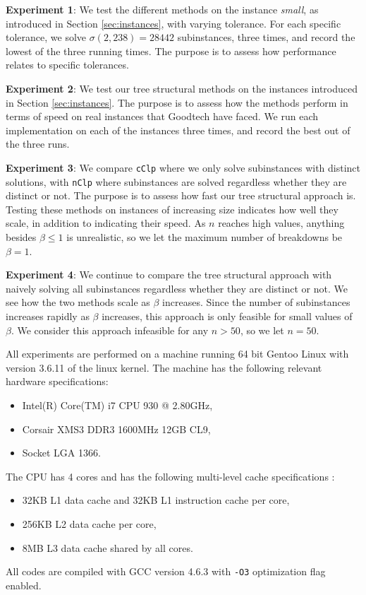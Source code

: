 \textbf{Experiment 1}:
We test the different
methods on the instance \textit{small}, as introduced in Section
\ref{sec:instances}, with varying tolerance.
For each specific tolerance, we solve $\sigma(2, 238) = 28442$ subinstances, three times,
and record the lowest of the three running times.
The purpose is to assess how performance relates to specific tolerances.

\textbf{Experiment 2}:
We test our tree structural methods on the instances introduced in Section
\ref{sec:instances}.
The purpose is to assess how the methods perform in terms of speed
on real instances that Goodtech have faced.
We run each implementation on each of the instances three times, and record
the best out of the three runs.

\textbf{Experiment 3}:
We compare \texttt{cClp} where we only solve subinstances with distinct
solutions, with \texttt{nClp} where subinstances are solved regardless
whether they are distinct or not.
The purpose is to assess how fast our tree structural approach is.
Testing these methods on instances of increasing size indicates how well
they scale, in addition to indicating their speed. 
As $n$ reaches high values, anything besides $\beta \leq 1$ is unrealistic,
so we let the maximum number of breakdowns be $\beta = 1$.

\textbf{Experiment 4}:
We continue to compare the tree structural approach with naively solving all
subinstances regardless whether they are distinct or not. We
see how the two methods scale as $\beta$ increases. Since the number
of subinstances increases rapidly as $\beta$ increases, this approach is only
feasible for small values of $\beta$. We consider this approach infeasible for
any $n > 50$, so we let $n = 50$.

All experiments are performed on a machine running 64 bit Gentoo Linux
with version 3.6.11 of the linux kernel. The machine has the following
relevant hardware specifications:
\begin{itemize}
    \item Intel(R) Core(TM) i7 CPU 930 @ 2.80GHz,
    \item Corsair XMS3 DDR3 1600MHz 12GB CL9,
    \item Socket LGA 1366.
\end{itemize}
The CPU has 4 cores and has the following multi-level cache specifications
\cite{intel}:
\begin{itemize}
    \item 32KB L1 data cache and 32KB L1 instruction cache per core,
    \item 256KB L2 data cache per core,
    \item 8MB L3 data cache shared by all cores.
\end{itemize}
All codes are compiled with GCC version 4.6.3 with \texttt{-O3}
optimization flag enabled.

